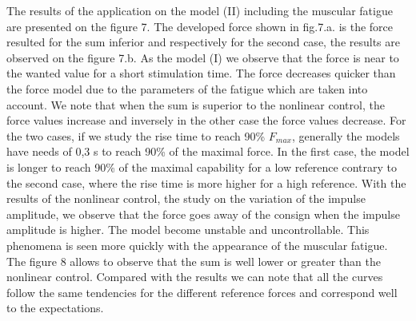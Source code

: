\documentclass[10pt,twocolumn,letterpaper, 
]{article}
\begin{document}
The results of the application on the model (II) including the muscular fatigue are presented on the figure 7. The developed force shown in fig.7.a. is the force resulted for the sum inferior and respectively for the second case, the results are observed on the figure 7.b. As the model (I) we observe that the force is near to the wanted value for a short stimulation time. The force decreases quicker than the force model due to the parameters of the fatigue which are taken into account. We note that when the sum is superior to the nonlinear control, the force values increase and inversely in the other case the force values decrease. For the two cases, if we study the rise time to reach 90\% $F_{max}$, generally the models have needs of 0,3 s to reach 90\% of the maximal force. In the first case, the model is longer to reach 90\% of the maximal capability for a low reference contrary to the second case, where the rise time is more higher for a high reference. With the results of the nonlinear control, the study on the variation of the impulse amplitude, we observe that the force goes away of the consign when the impulse amplitude is higher. The model become unstable and uncontrollable. This phenomena is seen more quickly with the appearance of the muscular fatigue. The figure 8 allows to observe that the sum is well lower or greater than the nonlinear control. Compared with the results we can note that all the curves follow the same tendencies for the different reference forces and correspond well to the expectations.
\end{document}
